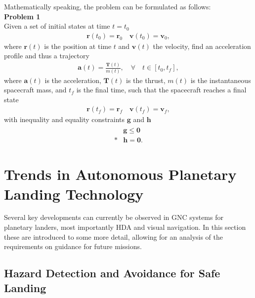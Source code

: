 \documentclass[%
]{aiaa-tc}
\begin{document}
Mathematically speaking, the problem can be formulated as follows:\\

\noindent\textbf{Problem 1}\\
\noindent
Given a set of initial states at time $t = t_0 $
\begin{align}
    \mathbf{r}(t_0) = \mathbf{r}_0 \quad \mathbf{v}(t_0) = \mathbf{v}_0,
\end{align}
where $\mathbf{r}(t)$ is the position at time $t$ and $\mathbf{v}(t)$ the
velocity, find an acceleration profile and thus a trajectory 
\begin{align} \mathbf{a}(t) =
    \frac{\mathbf{T}(t)}{m(t)}, \quad \forall\quad t \in [t_0, t_f],
\end{align}
where $\mathbf{a}(t)$ is the acceleration, $\mathbf{T}(t)$ is the thrust, $m(t)$
is the instantaneous spacecraft mass, and $t_f$ is the final time, such that the
spacecraft reaches a final state
\begin{align}
    \mathbf{r}(t_f) = \mathbf{r}_f \quad \mathbf{v}(t_f) =
    \mathbf{v}_f,
\end{align}
with inequality and equality constraints $\mathbf{g}$ and $\mathbf{h}$
\begin{align}
    \begin{split}
        & \mathbf{g} \leq \mathbf{0} \\*
        & \mathbf{h} = \mathbf{0}.
    \end{split}
\end{align}



\section{Trends in Autonomous Planetary Landing Technology}

Several key developments can currently be observed in GNC systems for planetary
landers, most importantly HDA and visual navigation. In this section these are
introduced to some more detail, allowing for an analysis of the requirements on
guidance for future missions. 

\subsection{Hazard Detection and Avoidance for Safe Landing}
\end{document}
